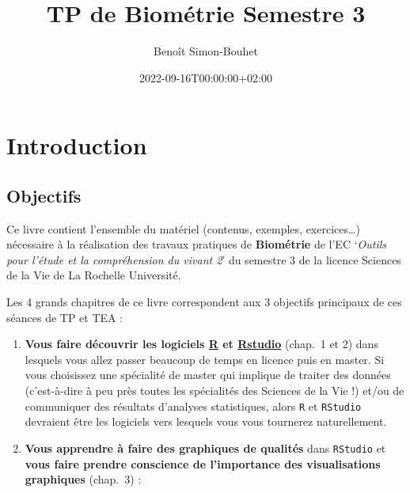 \documentclass[
  letterpaper,
  DIV=11,
  numbers=noendperiod]{scrreprt}
\title{TP de Biométrie Semestre 3}
\author{Benoît Simon-Bouhet}
\date{2022-09-16T00:00:00+02:00}
\renewcommand*\contentsname{Table des matières}
\newcommand\contentsname{Table des matières}
\begin{document}
\maketitle
\ifdefined\Shaded\renewenvironment{Shaded}{\begin{tcolorbox}[borderline west={3pt}{0pt}{shadecolor}, enhanced, breakable, frame hidden, boxrule=0pt, sharp corners, interior hidden]}{\end{tcolorbox}}\fi

\renewcommand*\contentsname{Table des matières}
{
\hypersetup{linkcolor=}
\setcounter{tocdepth}{2}
\tableofcontents
}

\hypertarget{introduction}{%
\chapter*{Introduction}\label{introduction}}

\hypertarget{objectifs}{%
\section*{Objectifs}\label{objectifs}}

Ce livre contient l'ensemble du matériel (contenus, exemples,
exercices\ldots) nécessaire à la réalisation des travaux pratiques de
\textbf{Biométrie} de l'EC `\emph{Outils pour l'étude et la
compréhension du vivant 2}' du semestre 3 de la licence Sciences de la
Vie de La Rochelle Université.

Les 4 grands chapitres de ce livre correspondent aux 3 objectifs
principaux de ces séances de TP et TEA :

\begin{enumerate}
\def\labelenumi{\arabic{enumi}.}
\item
  \textbf{Vous faire découvrir les logiciels
  \href{https://cran.r-project.org}{R} et
  \href{https://www.rstudio.com}{Rstudio}} (chap.~1 et 2) dans lesquels
  vous allez passer beaucoup de temps en licence puis en master. Si vous
  choisissez une spécialité de master qui implique de traiter des
  données (c'est-à-dire à peu près toutes les spécialités des Sciences
  de la Vie !) et/ou de communiquer des résultats d'analyses
  statistiques, alors \texttt{R} et \texttt{RStudio} devraient être les
  logiciels vers lesquels vous vous tournerez naturellement.
\item
  \textbf{Vous apprendre à faire des graphiques de qualités} dans
  \texttt{RStudio} et \textbf{vous faire prendre conscience de
  l'importance des visualisations graphiques} (chap.~3) :
\end{enumerate}
\end{document}
